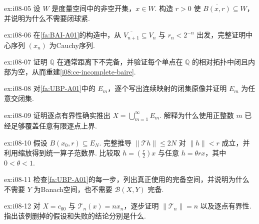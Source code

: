 \begin{FAExercise}[嵌套球中的闭包包含]{ex:i08-05}
设 \(\displaystyle W\) 是度量空间中的非空开集，\(\displaystyle x\in W\). 构造 \(\displaystyle r>0\) 使 \(\displaystyle \overline{B(x,r)}\subseteq W\)，并说明为什么不需要闭球紧.
\end{FAExercise}

\begin{FAExercise}[Baire证明中的Cauchy步骤]{ex:i08-06}
在\autoref{fa:BAI-A01}的构造中，从 \(\displaystyle \overline{V_{n+1}}\subseteq V_n\) 与 \(\displaystyle r_n<2^{-n}\) 出发，完整证明中心序列 \(\displaystyle (x_n)\) 为Cauchy序列.
\end{FAExercise}

\begin{FAExercise}[有理数的Baire失败]{ex:i08-07}
证明 \(\displaystyle \mathbb Q\) 在通常距离下不完备，并验证每个单点在 \(\displaystyle \mathbb Q\) 的相对拓扑中闭且内部为空，从而重建\autoref{i08:ce-incomplete-baire}.
\end{FAExercise}

\begin{FAExercise}[一致有界性中的闭集]{ex:i08-08}
对\autoref{fa:UBP-A01}中的 \(\displaystyle E_m\)，逐个写出连续映射的闭集原像并证明 \(\displaystyle E_m\) 为任意交闭集.
\end{FAExercise}

\begin{FAExercise}[逐点有界给出可数覆盖]{ex:i08-09}
证明逐点有界性确实推出 \(\displaystyle X=\bigcup_{m=1}^{\infty}E_m\). 解释为什么使用正整数 \(\displaystyle m\) 已经足够覆盖任意有限逐点上界.
\end{FAExercise}

\begin{FAExercise}[局部界到算子范数界]{ex:i08-10}
假设 \(\displaystyle B(x_0,r)\subseteq E_N\). 完整推导 \(\displaystyle \|\mathcal T h\|\leqslant2N\) 对 \(\displaystyle \|h\|<r\) 成立，并利用缩放得到统一算子范数界. 比较取 \(\displaystyle h=(\frac{r}{2})x\) 与任意 \(\displaystyle h=\theta r x\)，其中 \(\displaystyle0<\theta<1\).
\end{FAExercise}

\begin{FAExercise}[值域完备性并非必要]{ex:i08-11}
检查\autoref{fa:UBP-A01}的每一步，列出真正使用的完备空间，并说明为什么不需要 \(\displaystyle Y\) 为Banach空间，也不需要 \(\displaystyle \mathcal B(X,Y)\) 完备.
\end{FAExercise}

\begin{FAExercise}[不完备定义域上的失败]{ex:i08-12}
对 \(\displaystyle X=c_{00}\) 与 \(\displaystyle \mathcal T_n(x)=nx_n\)，逐步证明 \(\displaystyle \|\mathcal T_n\|=n\) 以及逐点有界性. 指出该例删掉的假设和失败的结论分别是什么.
\end{FAExercise}

